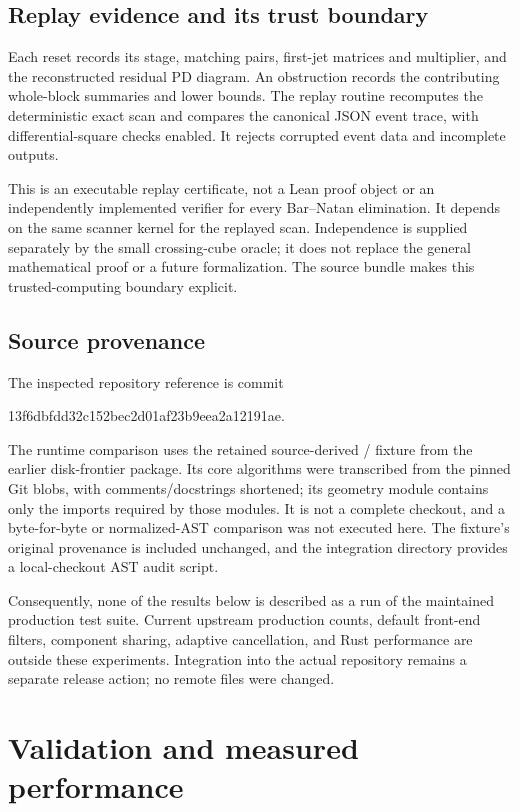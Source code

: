 \documentclass[11pt]{article}
\theoremstyle{definition}\newtheorem{definition}[theorem]{Definition}\newtheorem{example}[theorem]{Example}
\theoremstyle{remark}\newtheorem{remark}[theorem]{Remark}
\newcommand{\code}[1]{\texttt{\detokenize{#1}}}
\begin{document}
\subsection{Replay evidence and its trust boundary}
Each reset records its stage, matching pairs, first-jet matrices and multiplier, and the reconstructed residual PD diagram. An obstruction records the contributing whole-block summaries and lower bounds. The replay routine recomputes the deterministic exact scan and compares the canonical JSON event trace, with differential-square checks enabled. It rejects corrupted event data and incomplete \code{UNKNOWN} outputs.

This is an executable replay certificate, not a Lean proof object or an independently implemented verifier for every Bar--Natan elimination. It depends on the same scanner kernel for the replayed scan. Independence is supplied separately by the small crossing-cube oracle; it does not replace the general mathematical proof or a future formalization. The source bundle makes this trusted-computing boundary explicit.

\subsection{Source provenance}
The inspected repository reference is commit
\begin{center}\small\ttfamily 13f6dbfdd32c152bec2d01af23b9eea2a12191ae.\end{center}
The runtime comparison uses the retained source-derived \code{FastScan}/\code{Planar} fixture from the earlier disk-frontier package. Its core algorithms were transcribed from the pinned Git blobs, with comments/docstrings shortened; its geometry module contains only the imports required by those modules. It is not a complete checkout, and a byte-for-byte or normalized-AST comparison was not executed here. The fixture's original provenance is included unchanged, and the integration directory provides a local-checkout AST audit script.

Consequently, none of the results below is described as a run of the maintained production test suite. Current upstream production counts, default front-end filters, component sharing, adaptive cancellation, and Rust performance are outside these experiments. Integration into the actual repository remains a separate release action; no remote files were changed.

\section{Validation and measured performance}
\end{document}
